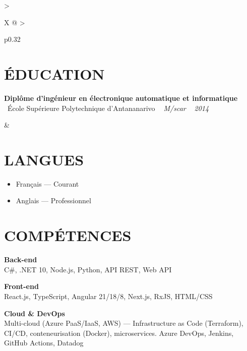 \documentclass[10pt,a4paper]{article}
\begin{document}
\setlength{\tabcolsep}{0pt}
\begin{tabularx}{\textwidth}{
  >{\raggedright\arraybackslash}X
  @{\hspace{1cm}}
  >{\raggedright\arraybackslash}p{0.32\textwidth}
}
\begin{minipage}[t]{\linewidth}
\section*{ÉDUCATION}

\textbf{Diplôme d'ingénieur en électronique automatique et informatique}\\
\textcolor{primary}{ \faGraduationCap\ École Supérieure Polytechnique d'Antananarivo} \quad
\textit{ \small \textcolor{darkgray}{ \faMapMarker\ } M/scar } \hfill  \textit{ \small \textcolor{darkgray}{ \faCalendar\ } 2014 }
\end{minipage}
&
\begin{minipage}[t]{\linewidth}

\section*{LANGUES}

\begin{itemize}
  \item Français --- Courant
  \item Anglais --- Professionnel
\end{itemize}

\section*{COMPÉTENCES}

\textbf{\color{primary} Back-end}\\
\color{darkgray} C\#, .NET 10, Node.js, Python, API REST, Web API

\vspace{4pt}

\textbf{\color{primary} Front-end}\\
\color{darkgray} React.js, TypeScript, Angular 21/18/8, Next.js, RxJS, HTML/CSS

\vspace{4pt}

\textbf{\color{primary} Cloud \& DevOps}\\
\color{darkgray} Multi-cloud (Azure PaaS/IaaS, AWS) --- Infrastructure as Code (Terraform), CI/CD, conteneurisation (Docker), microservices. Azure DevOps, Jenkins, GitHub Actions, Datadog


\end{minipage}
\end{tabularx}
\end{document}
